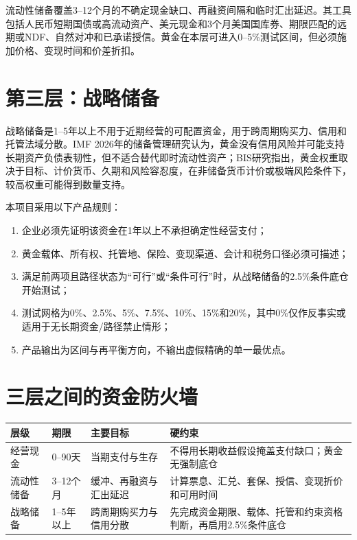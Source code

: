 \documentclass[UTF8,fontset=windows,12pt,openany]{ctexbook}
\begin{document}
流动性储备覆盖3--12个月的不确定现金缺口、再融资间隔和临时汇出延迟。其工具包括人民币短期国债或高流动资产、美元现金和3个月美国国库券、期限匹配的远期或NDF、自然对冲和已承诺授信。黄金在本层可进入0--5\%测试区间，但必须施加价格、变现时间和价差折扣。

\section{第三层：战略储备}

战略储备是1--5年以上不用于近期经营的可配置资金，用于跨周期购买力、信用和托管法域分散。IMF 2026年的储备管理研究认为，黄金没有信用风险并可能支持长期资产负债表韧性，但不适合替代即时流动性资产\cite{imfgold2026}；BIS研究指出，黄金权重取决于目标、计价货币、久期和风险容忍度，在非储备货币计价或极端风险条件下，较高权重可能得到数量支持\cite{bisgold2020}。

本项目采用以下产品规则：

\begin{enumerate}
  \item 企业必须先证明该资金在1年以上不承担确定性经营支付；
  \item 黄金载体、所有权、托管地、保险、变现渠道、会计和税务口径必须可描述；
  \item 满足前两项且路径状态为“可行”或“条件可行”时，从战略储备的2.5\%条件底仓开始测试；
  \item 测试网格为0\%、2.5\%、5\%、7.5\%、10\%、15\%和20\%，其中0\%仅作反事实或适用于无长期资金/路径禁止情形；
  \item 产品输出为区间与再平衡方向，不输出虚假精确的单一最优点。
\end{enumerate}

\section{三层之间的资金防火墙}

\begin{longtable}{p{2.8cm}p{2.8cm}p{3.5cm}p{4.5cm}}
\toprule
\textbf{层级} & \textbf{期限} & \textbf{主要目标} & \textbf{硬约束}\\
\midrule
经营现金 & 0--90天 & 当期支付与生存 & 不得用长期收益假设掩盖支付缺口；黄金无强制底仓\\
流动性储备 & 3--12个月 & 缓冲、再融资与汇出延迟 & 计算票息、汇兑、套保、授信、变现折价和可用时间\\
战略储备 & 1--5年以上 & 跨周期购买力与信用分散 & 先完成资金期限、载体、托管和约束资格判断，再启用2.5\%条件底仓\\
\bottomrule
\end{longtable}
\end{document}
